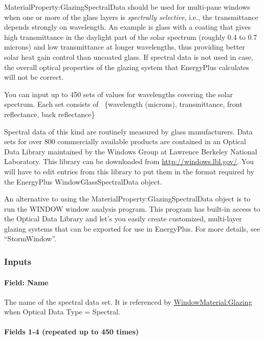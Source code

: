 MaterialProperty:GlazingSpectralData should be used for multi-pane windows when one or more of the glass layers is \emph{spectrally selective}, i.e., the transmittance depends strongly on wavelength. An example is glass with a coating that gives high transmittance in the daylight part of the solar spectrum (roughly 0.4 to 0.7 microns) and low transmittance at longer wavelengths, thus providing better solar heat gain control than uncoated glass. If spectral data is not used in case, the overall optical properties of the glazing system that EnergyPlus calculates will not be correct.

You can input up to 450 sets of values for wavelengths covering the solar spectrum. Each set consists of~ \{wavelength (microns), transmittance, front reflectance, back reflectance\}

Spectral data of this kind are routinely measured by glass manufacturers. Data sets for over 800 commercially available products are contained in an Optical Data Library maintained by the Windows Group at Lawrence Berkeley National Laboratory. This library can be downloaded from \url{http://windows.lbl.gov/}. You will have to edit entries from this library to put them in the format required by the EnergyPlus WindowGlassSpectralData object.

An alternative to using the MaterialProperty:GlazingSpectralData object is to run the WINDOW window analysis program. This program has built-in access to the Optical Data Library and let's you easily create customized, multi-layer glazing systems that can be exported for use in EnergyPlus. For more details, see ``StormWindow''.

\subsubsection{Inputs}\label{inputs-33-000}

\paragraph{Field: Name}\label{field-name-27-002}

The name of the spectral data set. It is referenced by \hyperref[windowmaterialglazing]{WindowMaterial:Glazing} when Optical Data Type = Spectral.

\paragraph{Fields 1-4 (repeated up to 450 times)}\label{fields-1-4-repeated-up-to-450-times}

